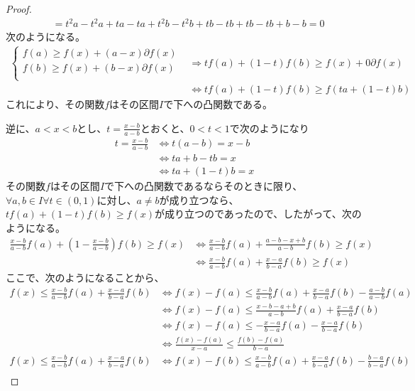 \documentclass[dvipdfmx]{jsarticle}
\begin{document}
\begin{proof}
\begin{align*}
&= t^{2}a - t^{2}a + ta - ta + t^{2}b - t^{2}b + tb - tb + tb - tb + b - b = 0
\end{align*}
次のようになる。
\begin{align*}
\left\{ \begin{matrix}
f(a) \geq f(x) + (a - x)\partial f(x) \\
f(b) \geq f(x) + (b - x)\partial f(x) \\
\end{matrix} \right. &\Rightarrow tf(a) + (1 - t)f(b) \geq f(x) + 0\partial f(x)\\
&\Leftrightarrow tf(a) + (1 - t)f(b) \geq f\left( ta + (1 - t)b \right)
\end{align*}
これにより、その関数$f$はその区間$I$で下への凸関数である。\par
逆に、$a < x < b$とし、$t = \frac{x - b}{a - b}$とおくと、$0 < t < 1$で次のようになり
\begin{align*}
t = \frac{x - b}{a - b} &\Leftrightarrow t(a - b) = x - b\\
&\Leftrightarrow ta + b - tb = x\\
&\Leftrightarrow ta + (1 - t)b = x
\end{align*}
その関数$f$はその区間$I$で下への凸関数であるならそのときに限り、$\forall a,b \in I\forall t \in (0,1)$に対し、$a \neq b$が成り立つなら、$tf(a) + (1 - t)f(b) \geq f(x)$が成り立つのであったので、したがって、次のようになる。
\begin{align*}
\frac{x - b}{a - b}f(a) + \left( 1 - \frac{x - b}{a - b} \right)f(b) \geq f(x) &\Leftrightarrow \frac{x - b}{a - b}f(a) + \frac{a - b - x + b}{a - b}f(b) \geq f(x)\\
&\Leftrightarrow \frac{x - b}{a - b}f(a) + \frac{x - a}{b - a}f(b) \geq f(x)
\end{align*}
ここで、次のようになることから、
\begin{align*}
f(x) \leq \frac{x - b}{a - b}f(a) + \frac{x - a}{b - a}f(b) &\Leftrightarrow f(x) - f(a) \leq \frac{x - b}{a - b}f(a) + \frac{x - a}{b - a}f(b) - \frac{a - b}{a - b}f(a)\\
&\Leftrightarrow f(x) - f(a) \leq \frac{x - b - a + b}{a - b}f(a) + \frac{x - a}{b - a}f(b)\\
&\Leftrightarrow f(x) - f(a) \leq - \frac{x - a}{b - a}f(a) - \frac{x - a}{b - a}f(b)\\
&\Leftrightarrow \frac{f(x) - f(a)}{x - a} \leq \frac{f(b) - f(a)}{b - a}\\
f(x) \leq \frac{x - b}{a - b}f(a) + \frac{x - a}{b - a}f(b) &\Leftrightarrow f(x) - f(b) \leq \frac{x - b}{a - b}f(a) + \frac{x - a}{b - a}f(b) - \frac{b - a}{b - a}f(b)\\

\end{align*}
\end{proof}
\end{document}
